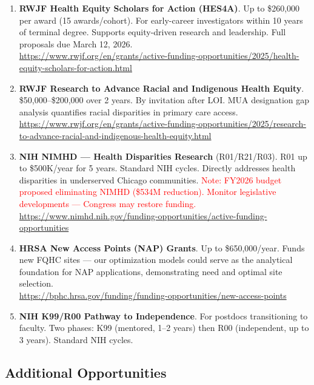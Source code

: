 \documentclass[11pt]{article}
\begin{document}
\begin{enumerate}

\item \textbf{RWJF Health Equity Scholars for Action (HES4A)}. Up to \$260,000 per award (15 awards/cohort). For early-career investigators within 10 years of terminal degree. Supports equity-driven research and leadership. Full proposals due March 12, 2026. \\
\url{https://www.rwjf.org/en/grants/active-funding-opportunities/2025/health-equity-scholars-for-action.html}

\item \textbf{RWJF Research to Advance Racial and Indigenous Health Equity}. \$50,000--\$200,000 over 2 years. By invitation after LOI. MUA designation gap analysis quantifies racial disparities in primary care access. \\
\url{https://www.rwjf.org/en/grants/active-funding-opportunities/2025/research-to-advance-racial-and-indigenous-health-equity.html}

\item \textbf{NIH NIMHD — Health Disparities Research} (R01/R21/R03). R01 up to \$500K/year for 5 years. Standard NIH cycles. Directly addresses health disparities in underserved Chicago communities. \textcolor{red}{Note: FY2026 budget proposed eliminating NIMHD (\$534M reduction). Monitor legislative developments — Congress may restore funding.} \\
\url{https://www.nimhd.nih.gov/funding-opportunities/active-funding-opportunities}

\item \textbf{HRSA New Access Points (NAP) Grants}. Up to \$650,000/year. Funds new FQHC sites — our optimization models could serve as the analytical foundation for NAP applications, demonstrating need and optimal site selection. \\
\url{https://bphc.hrsa.gov/funding/funding-opportunities/new-access-points}

\item \textbf{NIH K99/R00 Pathway to Independence}. For postdocs transitioning to faculty. Two phases: K99 (mentored, 1--2 years) then R00 (independent, up to 3 years). Standard NIH cycles.

\end{enumerate}

\subsection*{Additional Opportunities}
\end{document}
